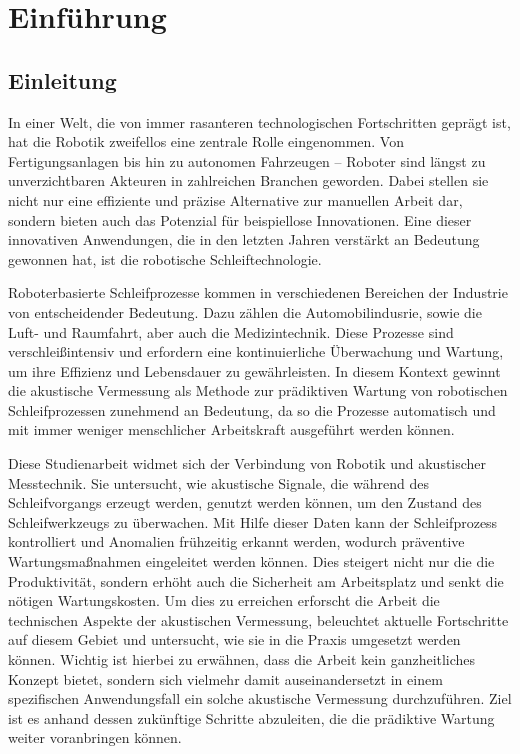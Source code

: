 \chapter{Einführung}
\label{Kapitel1}

\section{Einleitung}

In einer Welt, die von immer rasanteren technologischen Fortschritten geprägt ist, hat die Robotik zweifellos eine zentrale Rolle eingenommen. Von Fertigungsanlagen bis hin zu autonomen Fahrzeugen – Roboter sind längst zu unverzichtbaren Akteuren in zahlreichen Branchen geworden. Dabei stellen sie nicht nur eine effiziente und präzise Alternative zur manuellen Arbeit dar, sondern bieten auch das Potenzial für beispiellose Innovationen. Eine dieser innovativen Anwendungen, die in den letzten Jahren verstärkt an Bedeutung gewonnen hat, ist die robotische Schleiftechnologie.

Roboterbasierte Schleifprozesse kommen in verschiedenen Bereichen der Industrie von entscheidender Bedeutung. Dazu zählen die Automobilindusrie, sowie die Luft- und Raumfahrt, aber auch die Medizintechnik. Diese Prozesse sind verschleißintensiv und erfordern eine kontinuierliche Überwachung und Wartung, um ihre Effizienz und Lebensdauer zu gewährleisten. In diesem Kontext gewinnt die akustische Vermessung als Methode zur prädiktiven Wartung von robotischen Schleifprozessen zunehmend an Bedeutung, da so die Prozesse automatisch und mit immer weniger menschlicher Arbeitskraft ausgeführt werden können.

Diese Studienarbeit widmet sich der Verbindung von Robotik und akustischer Messtechnik. Sie untersucht, wie akustische Signale, die während des Schleifvorgangs erzeugt werden, genutzt werden können, um den Zustand des Schleifwerkzeugs zu überwachen. Mit Hilfe dieser Daten kann der Schleifprozess kontrolliert und Anomalien frühzeitig erkannt werden, wodurch präventive Wartungsmaßnahmen eingeleitet werden können. Dies steigert nicht nur die die Produktivität, sondern erhöht auch die Sicherheit am Arbeitsplatz und senkt die nötigen Wartungskosten. Um dies zu erreichen erforscht die Arbeit die technischen Aspekte der akustischen Vermessung, beleuchtet aktuelle Fortschritte auf diesem Gebiet und untersucht, wie sie in die Praxis umgesetzt werden können. Wichtig ist hierbei zu erwähnen, dass die Arbeit kein ganzheitliches Konzept bietet, sondern sich vielmehr damit auseinandersetzt in einem spezifischen Anwendungsfall ein solche akustische Vermessung durchzuführen. Ziel ist es anhand dessen zukünftige Schritte abzuleiten, die die prädiktive Wartung weiter voranbringen können.

